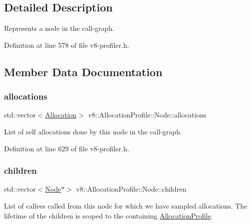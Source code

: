 \subsection{Detailed Description}
Represents a node in the call-\/graph. 

Definition at line 578 of file v8-\/profiler.\+h.



\subsection{Member Data Documentation}
\mbox{\label{structv8_1_1AllocationProfile_1_1Node_a6ee0934b35ba77fb5d8b53f02d5a3068}} 
\subsubsection{\texorpdfstring{allocations}{allocations}}
{\footnotesize\ttfamily std\+::vector$<$\mbox{\hyperlink{structv8_1_1AllocationProfile_1_1Allocation}{Allocation}}$>$ v8\+::\+Allocation\+Profile\+::\+Node\+::allocations}

List of self allocations done by this node in the call-\/graph. 

Definition at line 629 of file v8-\/profiler.\+h.

\mbox{\label{structv8_1_1AllocationProfile_1_1Node_a176673c0440cb1baaf7713e14da84db0}} 
\subsubsection{\texorpdfstring{children}{children}}
{\footnotesize\ttfamily std\+::vector$<$\mbox{\hyperlink{structv8_1_1AllocationProfile_1_1Node}{Node}}$\ast$$>$ v8\+::\+Allocation\+Profile\+::\+Node\+::children}

List of callees called from this node for which we have sampled allocations. The lifetime of the children is scoped to the containing \mbox{\hyperlink{classv8_1_1AllocationProfile}{Allocation\+Profile}}. 

